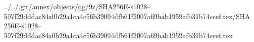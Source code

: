 ../../.git/annex/objects/qg/9z/SHA256E-s1028--597f29dddac84a0b29a1ca4c56b39094dfb61f2007a69bab1959afb31b74eeef.tex/SHA256E-s1028--597f29dddac84a0b29a1ca4c56b39094dfb61f2007a69bab1959afb31b74eeef.tex